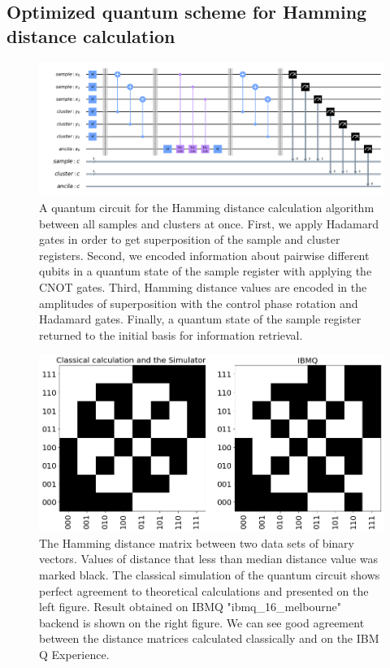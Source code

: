 \documentclass[pra,showkeys,twocolumn,showpacs]{revtex4-1}
\begin{document}
\subsection{Optimized quantum scheme for Hamming distance calculation}
\label{subsec:qcircuit}


\begin{figure}[t]
	\label{fig:qcircuit}
	\includegraphics[width=0.95\columnwidth]{qcircuit.png}
	\caption{
		A quantum circuit for the Hamming distance calculation algorithm between all samples and clusters at once. 
		First, we apply Hadamard gates in order to get superposition of the sample and cluster registers. 
		Second, we encoded information about pairwise different qubits in a quantum state of the sample register with applying the CNOT gates. 
		Third, Hamming distance values are encoded in the amplitudes of superposition with the control phase rotation and Hadamard gates. 
		Finally, a quantum state of the sample register returned to the initial basis for information retrieval.
	} 
\end{figure}



\begin{figure}[t]
	\label{fig:distance_matrix}
	\includegraphics[width=0.95\columnwidth]{distance_matrix.png}
	\caption{
		The Hamming distance matrix between two data sets of binary vectors. 
		Values of distance that less than median distance value was marked black. 
		The classical simulation of the quantum circuit shows perfect agreement to theoretical calculations and presented on the left figure. 
		Result obtained on  IBMQ "ibmq\_16\_melbourne" backend is shown on the right figure. 
		We can see good agreement between the distance matrices calculated classically and on the IBM Q Experience.
	} 
\end{figure}
\end{document}
